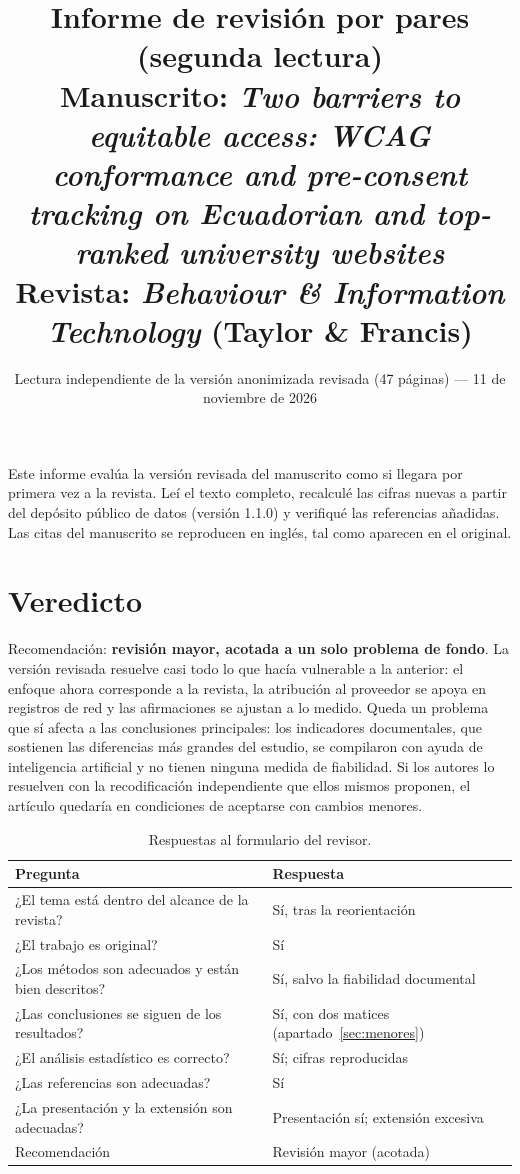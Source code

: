 \documentclass[11pt,a4paper]{article}
\title{\textbf{Informe de revisi\'on por pares (segunda lectura)}\\[4pt]
	\large Manuscrito: \emph{Two barriers to equitable access: WCAG conformance and pre-consent tracking on Ecuadorian and top-ranked university websites}\\[4pt]
	\normalsize Revista: \emph{Behaviour \& Information Technology} (Taylor \& Francis)}
\author{}
\date{Lectura independiente de la versi\'on anonimizada revisada (47 p\'aginas) --- 11 de noviembre de 2026}
\begin{document}
\maketitle
\thispagestyle{fancy}

\noindent Este informe eval\'ua la versi\'on revisada del manuscrito como si llegara por primera vez a la revista. Le\'i el texto completo, recalcul\'e las cifras nuevas a partir del dep\'osito p\'ublico de datos (versi\'on 1.1.0) y verifiqu\'e las referencias a\~nadidas. Las citas del manuscrito se reproducen en ingl\'es, tal como aparecen en el original.

\section{Veredicto}

Recomendaci\'on: \textbf{revisi\'on mayor, acotada a un solo problema de fondo}. La versi\'on revisada resuelve casi todo lo que hac\'ia vulnerable a la anterior: el enfoque ahora corresponde a la revista, la atribuci\'on al proveedor se apoya en registros de red y las afirmaciones se ajustan a lo medido. Queda un problema que s\'i afecta a las conclusiones principales: los indicadores documentales, que sostienen las diferencias m\'as grandes del estudio, se compilaron con ayuda de inteligencia artificial y no tienen ninguna medida de fiabilidad. Si los autores lo resuelven con la recodificaci\'on independiente que ellos mismos proponen, el art\'iculo quedar\'ia en condiciones de aceptarse con cambios menores.

\begin{table}[htbp]
	\centering
	\small
	\caption{Respuestas al formulario del revisor.}
	\begin{tabular}{@{}L{9.6cm}L{4.4cm}@{}}
		\toprule
		\textbf{Pregunta} & \textbf{Respuesta} \\
		\midrule
		¿El tema est\'a dentro del alcance de la revista? & S\'i, tras la reorientaci\'on \\
		¿El trabajo es original? & S\'i \\
		¿Los m\'etodos son adecuados y est\'an bien descritos? & S\'i, salvo la fiabilidad documental \\
		¿Las conclusiones se siguen de los resultados? & S\'i, con dos matices (apartado~\ref{sec:menores}) \\
		¿El an\'alisis estad\'istico es correcto? & S\'i; cifras reproducidas \\
		¿Las referencias son adecuadas? & S\'i \\
		¿La presentaci\'on y la extensi\'on son adecuadas? & Presentaci\'on s\'i; extensi\'on excesiva \\
		Recomendaci\'on & Revisi\'on mayor (acotada) \\
		\bottomrule
	\end{tabular}
\end{table}
\end{document}
